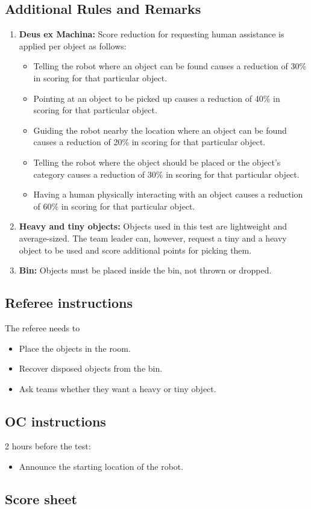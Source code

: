 \subsection{Additional Rules and Remarks}
\begin{enumerate}[nosep]
	\item \textbf{Deus ex Machina:} Score reduction for requesting human assistance is applied per object as follows:
	\begin{itemize}[nosep]
		\item Telling the robot where an object can be found causes a reduction of 30\% in scoring for that particular object.

		\item Pointing at an object to be picked up causes a reduction of 40\% in scoring for that particular object.
		
		\item Guiding the robot nearby the location where an object can be found causes a reduction of 20\% in scoring for that particular object.

		\item Telling the robot where the object should be placed or the object's category causes a reduction of 30\% in scoring for that particular object.

		\item Having a human physically interacting with an object causes a reduction of 60\% in scoring for that particular object.
	\end{itemize}
	
	\item \textbf{Heavy and tiny objects:} Objects used in this test are lightweight and average-sized.
	The team leader can, however, request a tiny and a heavy object to be used and score additional points for picking them.
	
	\item \textbf{Bin:} Objects must be placed inside the bin, not thrown or dropped.
\end{enumerate}

\subsection{Referee instructions}
The referee needs to
\begin{itemize}
	\item Place the objects in the room.
	\item Recover disposed objects from the bin.
	\item Ask teams whether they want a heavy or tiny object.
\end{itemize}

\subsection{OC instructions}
2 hours before the test:
\begin{itemize}
	\item Announce the starting location of the robot.
\end{itemize}

\newpage
\subsection{Score sheet}
